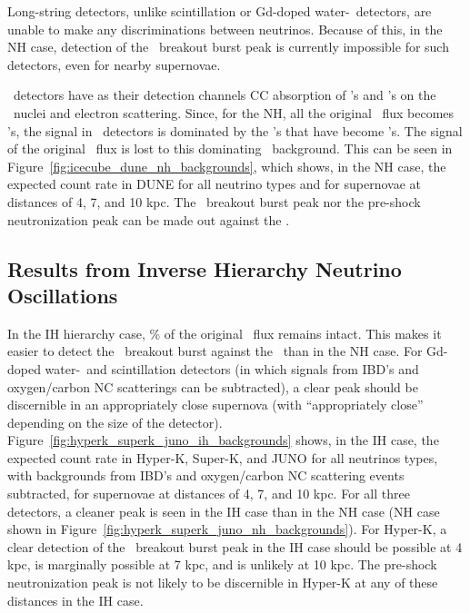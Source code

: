Long-string detectors, unlike scintillation or Gd-doped water-\cer\
detectors, are
unable to make any discriminations between neutrinos.  Because of
this, in the NH case, 
detection of the \nue\ breakout burst peak is currently impossible for such
detectors, even for nearby supernovae.




\ detectors have as their detection channels CC
absorption of \nue's and \anue's on the \ nuclei and electron
scattering.  Since, for the NH, all the original \nue\ flux becomes
\nuxpart's, the signal in \ar40\ detectors is dominated by the \nuxpart's that
have become \nue's.  The signal of the original \nue\ flux is lost to
this dominating \nuxpart\ background.  This can be seen in
Figure~\ref{fig:icecube_dune_nh_backgrounds}, which shows, in the NH
case, the expected count rate
in DUNE for all neutrino types and 
for supernovae at distances of 4, 7, and 10 kpc.  
The \nue\ breakout burst peak nor the pre-shock
neutronization peak can be made out against the
\backgrounds.  

\subsection{Results from Inverse Hierarchy Neutrino Oscillations}
In the IH hierarchy case, \abt 30\% of the original \nue\ flux remains
intact.  This makes it easier to detect the \nue\ breakout burst
against the \backgrounds\ than in the NH case.  For
Gd-doped water-\cer\ and scintillation detectors (in which signals from
IBD's and oxygen/carbon NC scatterings can be subtracted), a clear peak
should be discernible in an appropriately close supernova (with
``appropriately close'' depending on the size of the detector).  
Figure~\ref{fig:hyperk_superk_juno_ih_backgrounds}
shows, in the IH case, the expected count rate in Hyper-K, Super-K, and JUNO 
for all neutrinos types, with
backgrounds from IBD's and oxygen/carbon NC scattering events subtracted, for
supernovae at distances of 4, 7, and 10 kpc.  For all three detectors, a
cleaner peak is seen in the IH case than in the NH case (NH case shown
in Figure~\ref{fig:hyperk_superk_juno_nh_backgrounds}).  For Hyper-K, 
a clear detection of
the \nue\ breakout burst peak in the IH case 
should be possible at 4 kpc, is
marginally possible at 7 kpc, and is unlikely at 10 kpc. The
pre-shock neutronization peak is not likely to be discernible in
Hyper-K at
any of these distances in the IH case.

